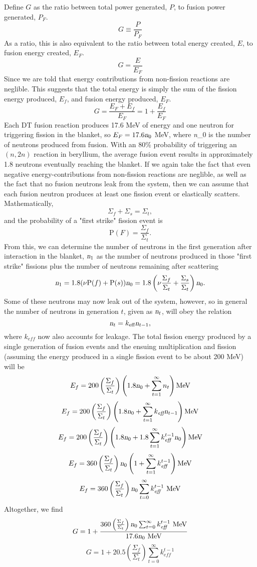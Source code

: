 \documentclass{article}
\newcommand{\Xs}{\Sigma}
\begin{document}
Define $G$ as the ratio between total power generated, $P$, to fusion power generated, $P_F$.
$$ G \equiv \frac{P}{P_F} $$
As a ratio, this is also equivalent to the ratio between total energy created, $E$, to fusion energy created, $E_F$.
$$ G  = \frac{E}{E_F} $$
Since we are told that energy contributions from non-fission reactions are neglible. This suggests that the total energy is simply the sum of the fission energy produced, $E_f$, and fusion energy produced, $E_F$. 
$$ G = \frac{E_F + E_f}{E_F} = 1 + \frac{E_f}{E_F}$$
Each DT fusion reaction produces 17.6 MeV of energy and one neutron for triggering fission in the blanket, so $E_F = 17.6\textsl{n}_0$ MeV, where \textsl{n}_0 is the number of neutrons produced from fusion. With an 80\% probability of triggering an $(n,2n)$ reaction in beryllium, the average fusion event results in approximately 1.8 neutrons eventually reaching the blanket. If we again take the fact that even negative energy-contributions from non-fission reactions are neglible, as well as the fact that no fusion neutrons leak from the system, then we can assume that each fusion neutron produces at least one fission event or elastically scatters. Mathematically,
$$ \Xs_f + \Xs_s = \Xs_t ,$$
and the probability of a "first strike" fission event is
$$ \text{P}(F) = \frac{\Xs_f}{\Xs_t}. $$
From this, we can determine the number of neutrons in the first generation after interaction in the blanket, $\textsl{n}_1$ as the number of neutrons produced in those "first strike" fissions plus the number of neutrons remaining after scattering
$$ \textsl{n}_1 = 1.8(\nu \text{P}(f) + \text{P}(s))\textsl{n}_0 = 1.8\left(\nu \frac{\Xs_f}{\Xs_t} + \frac{\Xs_s}{\Xs_t}\right)\textsl{n}_0 .$$
Some of these neutrons may now leak out of the system, however, so in general the number of neutrons in generation $t$, given as $\textsl{n}_t$, will obey the relation
$$ \textsl{n}_t = k_{\text{eff}}\textsl{n}_{t-1} ,$$
where $k_{\textit{eff}}$ now also accounts for leakage.
The total fission energy produced by a single generation of fusion events and the ensuing multiplication and fission (assuming the energy produced in a single fission event to be about 200 MeV) will be
$$ E_f = 200 \left(\frac{\Xs_f}{\Xs_t}\right)\left(1.8\textsl{n}_0 + \sum_{t=1}^{\infty} n_t \right) \text{MeV} $$
$$ E_f = 200 \left(\frac{\Xs_f}{\Xs_t}\right)\left(1.8\textsl{n}_0 + \sum_{t=1}^{\infty}k_{\textit{eff}}\textsl{n}_{t-1} \right) \text{MeV} $$
$$ E_f = 200 \left(\frac{\Xs_f}{\Xs_t}\right)\left(1.8\textsl{n}_0 + 1.8\sum_{t=1}^{\infty}k_{\textit{eff}}^{t-1}\textsl{n}_0 \right) \text{MeV} $$
$$ E_f = 360 \left(\frac{\Xs_f}{\Xs_t}\right)\textsl{n}_0 \left(1  + \sum_{t=1}^{\infty}k_{\textit{eff}}^{t-1} \right) \text{MeV} $$
$$ E_f = 360 \left(\frac{\Xs_f}{\Xs_t}\right)\textsl{n}_0 \sum_{t=0}^{\infty}k_{\textit{eff}}^{t-1} \text{ MeV} $$
Altogether, we find
$$ G = 1 + \frac{360 \left(\frac{\Xs_f}{\Xs_t}\right)\textsl{n}_0 \sum_{t=0}^{\infty}k_{\textit{eff}}^{t-1} \text{ MeV}}{17.6 \textsl{n}_0 \text{ MeV}} $$
$$\boxed{ G = 1 + 20.5 \left(\frac{\Xs_f}{\Xs_t}\right) \sum_{t=0}^{\infty}k_{\textit{eff}}^{t-1} }$$
\end{document}
